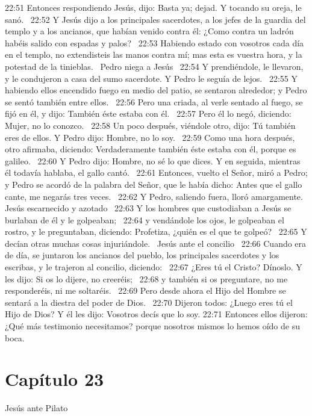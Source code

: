 22:51 Entonces respondiendo Jesús, dijo: Basta ya; dejad. Y tocando su oreja, le sanó.  
22:52 Y Jesús dijo a los principales sacerdotes, a los jefes de la guardia del templo y a los ancianos, que habían venido contra él: ¿Como contra un ladrón habéis salido con espadas y palos?  
22:53 Habiendo estado con vosotros cada día en el templo, no extendisteis las manos contra mí; mas esta es vuestra hora, y la potestad de la tinieblas.  
Pedro niega a Jesús   
22:54 Y prendiéndole, le llevaron, y le condujeron a casa del sumo sacerdote. Y Pedro le seguía de lejos.  
22:55 Y habiendo ellos encendido fuego en medio del patio, se sentaron alrededor; y Pedro se sentó también entre ellos.  
22:56 Pero una criada, al verle sentado al fuego, se fijó en él, y dijo: También éste estaba con él.  
22:57 Pero él lo negó, diciendo: Mujer, no lo conozco.  
22:58 Un poco después, viéndole otro, dijo: Tú también eres de ellos. Y Pedro dijo: Hombre, no lo soy.  
22:59 Como una hora después, otro afirmaba, diciendo: Verdaderamente también éste estaba con él, porque es galileo.  
22:60 Y Pedro dijo: Hombre, no sé lo que dices. Y en seguida, mientras él todavía hablaba, el gallo cantó.  
22:61 Entonces, vuelto el Señor, miró a Pedro; y Pedro se acordó de la palabra del Señor, que le había dicho: Antes que el gallo cante, me negarás tres veces.  
22:62 Y Pedro, saliendo fuera, lloró amargamente.  
Jesús escarnecido y azotado   
22:63 Y los hombres que custodiaban a Jesús se burlaban de él y le golpeaban;  
22:64 y vendándole los ojos, le golpeaban el rostro, y le preguntaban, diciendo: Profetiza, ¿quién es el que te golpeó?  
22:65 Y decían otras muchas cosas injuriándole.  
Jesús ante el concilio   
22:66 Cuando era de día, se juntaron los ancianos del pueblo, los principales sacerdotes y los escribas, y le trajeron al concilio, diciendo:  
22:67 ¿Eres tú el Cristo? Dínoslo. Y les dijo: Si os lo dijere, no creeréis;  
22:68 y también si os preguntare, no me responderéis, ni me soltaréis.  
22:69 Pero desde ahora el Hijo del Hombre se sentará a la diestra del poder de Dios.  
22:70 Dijeron todos: ¿Luego eres tú el Hijo de Dios? Y él les dijo: Vosotros decís que lo soy. 
22:71 Entonces ellos dijeron: ¿Qué más testimonio necesitamos? porque nosotros mismos lo hemos oído de su boca.  
\section*{Capítulo 23 }
Jesús ante Pilato   


